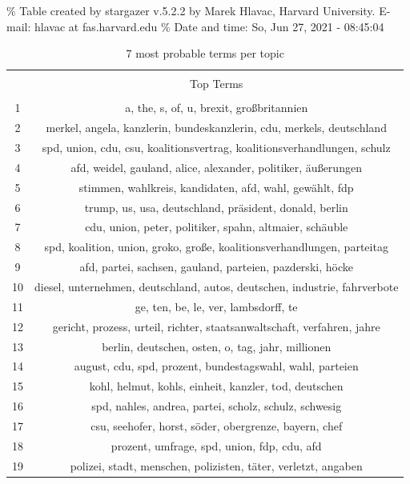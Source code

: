 \documentclass[
]{article}
\begin{document}
\% Table created by stargazer v.5.2.2 by Marek Hlavac, Harvard
University. E-mail: hlavac at fas.harvard.edu \% Date and time: So, Jun
27, 2021 - 08:45:04

\begin{table}[!htbp] \centering 
  \caption{7 most probable terms per topic} 
  \label{table:top_terms} 
\begin{tabular}{@{\extracolsep{5pt}} cc} 
\\[-1.8ex]\hline 
\hline \\[-1.8ex] 
 & Top Terms \\ 
\hline \\[-1.8ex] 
1 & a, the, s, of, u, brexit, großbritannien \\ 
2 & merkel, angela, kanzlerin, bundeskanzlerin, cdu, merkels, deutschland \\ 
3 & spd, union, cdu, csu, koalitionsvertrag, koalitionsverhandlungen, schulz \\ 
4 & afd, weidel, gauland, alice, alexander, politiker, äußerungen \\ 
5 & stimmen, wahlkreis, kandidaten, afd, wahl, gewählt, fdp \\ 
6 & trump, us, usa, deutschland, präsident, donald, berlin \\ 
7 & cdu, union, peter, politiker, spahn, altmaier, schäuble \\ 
8 & spd, koalition, union, groko, große, koalitionsverhandlungen, parteitag \\ 
9 & afd, partei, sachsen, gauland, parteien, pazderski, höcke \\ 
10 & diesel, unternehmen, deutschland, autos, deutschen, industrie, fahrverbote \\ 
11 & ge, ten, be, le, ver, lambsdorff, te \\ 
12 & gericht, prozess, urteil, richter, staatsanwaltschaft, verfahren, jahre \\ 
13 & berlin, deutschen, osten, o, tag, jahr, millionen \\ 
14 & august, cdu, spd, prozent, bundestagswahl, wahl, parteien \\ 
15 & kohl, helmut, kohls, einheit, kanzler, tod, deutschen \\ 
16 & spd, nahles, andrea, partei, scholz, schulz, schwesig \\ 
17 & csu, seehofer, horst, söder, obergrenze, bayern, chef \\ 
18 & prozent, umfrage, spd, union, fdp, cdu, afd \\ 
19 & polizei, stadt, menschen, polizisten, täter, verletzt, angaben \\ 

\end{tabular}
\end{table}
\end{document}
